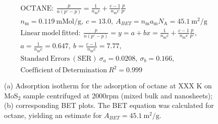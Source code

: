 

\begin{align*}
&\mathrm{OCTANE:}\ \frac{p}{n(p^\circ-p)}=\frac{1}{n_\mathrm{m}c}+\frac{c-1}{n_\mathrm{m}c}\frac{p}{p^\circ}\\
&{n_\mathrm{m}}=0.119\ \mathrm{mMol/g},\ c=13.0,\ A_{BET}={n_\mathrm{m}}{a_\mathrm{m}}{N_\mathrm{A}}=45.1\ \mathrm{m}^2\mathrm{/g}\\
&\mathrm{Linear\ model\ fitted:}\ \frac{p}{n(p^\circ-p)}=y=a+bx=\frac{1}{n_\mathrm{m}c}+\frac{c-1}{n_\mathrm{m}c}\frac{p}{p^\circ},\\
&a=\frac{1}{n_\mathrm{m}c}=0.647,\ b=\frac{c-1}{n_\mathrm{m}c}=7.77,\\
&\mathrm{Standard\ Errors\ (SER)}\ \sigma_a=0.0208,\ \sigma_b=0.166,\\
&\mathrm{Coefficient\ of\ Determination}\ R^2 = 0.999
\end{align*}


\begin{figure}[htb]
\hfill
{}
\caption{(a) Adsorption isotherm for the adsorption of octane at XXX K on MoS$_2$ 
sample centrifuged at 2000rpm (mixed bulk and nanosheets);
(b) corresponding BET plots. The BET equation was calculated for octane, yielding an estimate for $A_{BET}=45.1\ \mathrm{m}^2\mathrm{/g}$.}

\label{fig:sa-Nanosheets-Prep-I-1500rpm-10mg-01-3mm-30C-S1-SA-10ml}
\end{figure}


